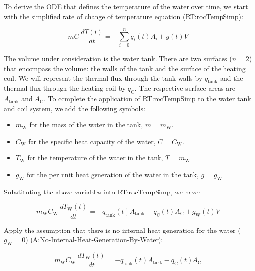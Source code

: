 \documentclass[12pt]{article}
\begin{document}
To derive the ODE that defines the temperature of the water over time, we start
with the simplified rate of change of temperature equation
(\hyperref[RT:rocTempSimp]{RT:rocTempSimp}):

\begin{displaymath}
        m C \frac{\,dT(t)}{\,dt} = -\sum_{i=0}^n {q_i(t)} {A_i} + g(t) V
\end{displaymath}

The volume under consideration is the water tank.  There are two surfaces
($n=2$) that encompass the volume: the walls of the tank and the surface of the
heating coil.  We will represent the thermal flux through the tank walls by
$q_\text{tank}$ and the thermal flux through the heating coil by $q_\text{C}$.
The respective surface areas are $A_\text{tank}$ and $A_\text{C}$. To complete
the application of \hyperref[RT:rocTempSimp]{RT:rocTempSimp} to the water tank
and coil system, we add the following symbols: 

\begin{itemize}
        \item $m_\text{W}$ for the mass of the water in the tank, $m = m_\text{W}$.
        \item $C_\text{W}$ for the specific heat capacity of the water, $C =
        C_\text{W}$.
        \item $T_\text{W}$ for the temperature of the water in the tank, $T =
        m_\text{W}$.
        \item $g_\text{W}$ for the per unit heat generation of the water in the
        tank, $g = g_\text{W}$.
\end{itemize}

Substituting the above variables into \hyperref[RT:rocTempSimp]{RT:rocTempSimp}, we have:

\begin{displaymath}
m_\text{W} C_\text{W} \frac{\,dT_\text{W}(t)}{\,dt} = -{q_\text{tank}(t)} {A_\text{tank}} -{q_\text{C}(t)} {A_\text{C}} + g_\text{W}(t) V
\end{displaymath}

Apply the assumption that there is no internal heat generation for the water
($g_\text{W} = 0$) (\hyperref[assumpNIHGBW]{A:No-Internal-Heat-Generation-By-Water}):

\begin{displaymath}
m_\text{W} C_\text{W} \frac{\,dT_\text{W}(t)}{\,dt} = -{q_\text{tank}(t)} {A_\text{tank}} -{q_\text{C}(t)} {A_\text{C}}
\end{displaymath}
\end{document}
